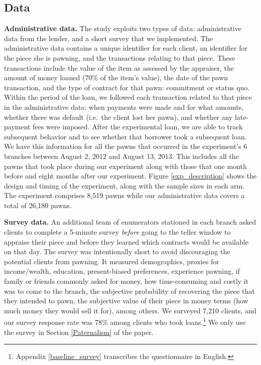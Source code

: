 \documentclass[11pt, a4paper]{article}
\begin{document}
\subsection{Data}

\vspace{.2in}
\noindent \textbf{Administrative data.} The study exploits two types of data: administrative data from the lender, and a short survey that we implemented. The administrative data contains a unique identifier for each client, an identifier for the piece she is pawning, and the transactions relating to that piece. These transactions include the value of the item as assessed by the appraiser, the amount of money loaned (70\% of the item's value), the date of the pawn transaction, and the type of contract for that pawn: commitment or status quo. Within the period of the loan, we followed each transaction related to that piece in the administrative data: when payments were made and for what amounts, whether there was default (i.e.\ the client lost her pawn), and whether any late-payment fees were imposed. After the experimental loan, we are able to track subsequent behavior and to see whether that borrower took a subsequent loan.  We have this information for all the pawns that occurred in the experiment's 6 branches between August 2, 2012 and August 13, 2013. This includes all the pawns that took place during our experiment along with those that one month before and eight months after our experiment. Figure \ref{exp_description} shows the design and timing of the experiment, along with the sample sizes in each arm. The experiment comprises 8,519 pawns while our administrative data covers a total of 26,180 pawns.

\vspace{.2in}
\noindent \textbf{Survey data.} An additional team of enumerators stationed in each branch asked clients to complete a 5-minute survey \textit{before} going to the teller window to appraise their piece and before they learned which contracts would be available on that day. The survey was intentionally short to avoid discouraging the potential clients from pawning. It measured demographics, proxies for income/wealth, education, present-biased preferences, experience pawning, if family or friends commonly asked for money, how time-consuming and costly it was to come to the branch, the subjective probability of recovering the piece that they intended to pawn, the subjective value of their piece in money terms (how much money they would sell it for), among others. We surveyed 7,210 clients, and our survey response rate was 78\% among clients who took loans.\footnote{Appendix \ref{baseline_survey} transcribes the questionnaire in English.} %
We only use the survey in Section \ref{Paternalism} of the paper.
\end{document}

